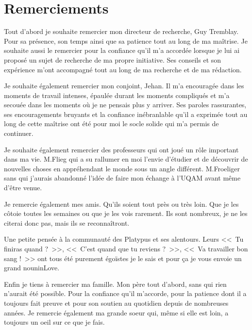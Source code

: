 \chapter*{Remerciements}


Tout d'abord je souhaite remercier mon directeur de recherche, Guy Tremblay.
Pour sa présence, son temps ainsi que sa patience tout au long de ma maîtrise.
Je souhaite aussi le remercier pour la confiance qu'il m'a accordée lorsque je lui ai proposé un sujet de recherche de ma propre initiative.
Ses conseils et son expérience m'ont accompagné tout au long de ma recherche et de ma rédaction.


Je souhaite également remercier mon conjoint, Jehan.
Il m'a encouragée dans les moments de travail intenses, épaulée durant les moments compliqués et m'a secouée dans les moments où je ne pensais plus y arriver. 
Ses paroles rassurantes, ses encouragements bruyants et la confiance inébranlable qu'il a exprimée tout au long de cette maîtrise ont été pour moi le socle solide qui m'a permis de continuer.


Je souhaite également remercier des professeurs qui ont joué un rôle important dans ma vie.
M.Flieg qui a su rallumer en moi l'envie d'étudier et de découvrir de nouvelles choses en appréhendant le monde sous un angle différent.
M.Froeliger sans qui j'aurais abandonné l'idée de faire mon échange à l'UQAM avant même d'être venue.


Je remercie également mes amis.
Qu'ils soient tout près ou très loin.
Que je les côtoie toutes les semaines ou que je les vois rarement.
Ils sont nombreux, je ne les citerai donc pas, mais ils se reconnaîtront.


Une petite pensée à la communauté des Platypus et ses alentours.
Leurs <<~Tu finiras quand ?~>>, <<~C'est quand que tu reviens ?~>>, <<~Va travailler bon sang !~>> ont tous été purement égoïstes je le sais et pour ça je vous envoie un grand nouninLove.


Enfin je tiens à remercier ma famille.
Mon père tout d'abord, sans qui rien n'aurait été possible.
Pour la confiance qu'il m'accorde, pour la patience dont il a toujours fait preuve et pour son soutien au quotidien depuis de nombreuses années.
Je remercie également ma grande soeur qui, même si elle est loin, a toujours un oeil sur ce que je fais.